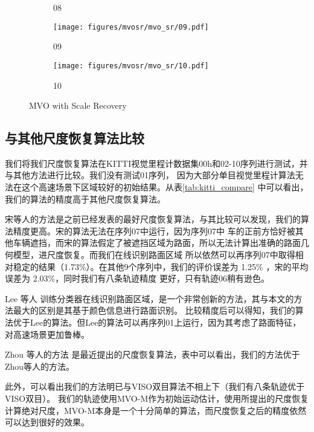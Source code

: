 \begin{figure}
\begin{subfigure}[b]{0.18\textwidth}
    \caption{08}
    \label{fig:mvo_path_08}
    \vspace*{2mm}
    \end{subfigure}
    \begin{subfigure}[b]{0.18\textwidth}
        \texttt{[image: figures/mvosr/mvo\_sr/09.pdf]}

    \caption{09}
    \label{fig:mvo_path_09}
    \vspace*{2mm}
    \end{subfigure}
    \begin{subfigure}[b]{0.18\textwidth}
        \texttt{[image: figures/mvosr/mvo\_sr/10.pdf]}

    \caption{10}
    \label{fig:mvo_path_10}
    \vspace*{2mm}
    \end{subfigure}   
    \caption{MVO with Scale Recovery}
    {\label{fig:mvo_scale_recovery}}
    
    \end{figure}


\subsection{与其他尺度恢复算法比较}
\label{sec:overall_evaluation}
我们将我们尺度恢复算法在KITTI视觉里程计数据集00h和02-10序列进行测试，并与其他方法进行比较。我们没有测试01序列，
因为大部分单目视觉里程计算法无法在这个高速场景下区域较好的初始结果。从表\ref{tab:kitti_compare} 中可以看出，
我们的算法的精度高于其他尺度恢复算法。

宋等人\cite{Song2015MoncularScale}的方法是之前已经发表的最好尺度恢复算法，与其比较可以发现，我们的算法精度更高。宋的算法无法在序列07中运行，因为序列07中
车的正前方恰好被其他车辆遮挡，而宋的算法假定了被遮挡区域为路面，所以无法计算出准确的路面几何模型，进尺度恢复。而我们在线识别路面区域
所以依然可以再序列07中取得相对稳定的结果（1.73\%）。在其他9个序列中，我们的评价误差为 1.25\% ，宋的平均误差为 2.03\%，同时我们有八条轨迹精度
更好，只有轨迹06稍有逊色。

Lee 等人\cite{Lee2015MoncularScale} 训练分类器在线识别路面区域，是一个非常创新的方法，其与本文的方法最大的区别是其基于颜色信息进行路面识别。
比较精度后可以得知，我们的算法优于Lee的算法。但Lee的算法可以再序列01上运行，因为其考虑了路面特征，对高速场景更加鲁棒。

Zhou 等人的方法\cite{zhou2016reliable} 是最近提出的尺度恢复算法，表中可以看出，我们的方法优于Zhou等人的方法。

此外，可以看出我们的方法明已与VISO双目算法不相上下（我们有八条轨迹优于VISO双目）。
我们的轨迹使用MVO-M作为初始运动估计，使用所提出的尺度恢复计算绝对尺度，MVO-M本身是一个十分简单的算法，而尺度恢复之后的精度依然可以达到很好的效果。



